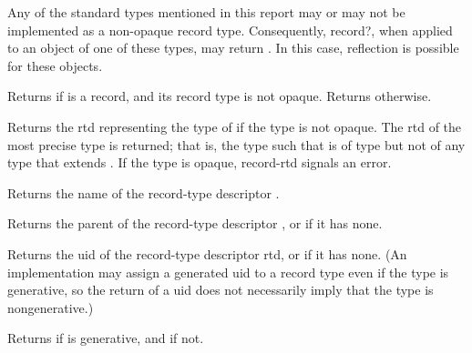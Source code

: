 Any of the standard types mentioned in this report may or may not be
implemented as a non-opaque record type.  Consequently, {\cf record?},
when applied to an object of one of these types, may return
\schtrue{}.  In this case, reflection is possible for these objects.

\begin{entry}{%
}
   
Returns \schtrue{} if  is a record, and its record type is
not opaque. Returns \schfalse{} otherwise.  
\end{entry}

\begin{entry}{%
}
   
Returns the rtd representing the type of  if the type is not
opaque. The rtd of the most precise type is returned; that is, the
type  such that  is of type  but not of any
type that extends .  If the type is opaque, {\cf record-rtd} signals
an error.
\end{entry}

\begin{entry}{%
}
   
Returns the name of the record-type descriptor .
\end{entry}   

\begin{entry}{%
}
   
Returns the parent of the record-type descriptor , or
\schfalse{} if it has none.
\end{entry}

\begin{entry}{%
}
   
Returns the uid of the record-type descriptor rtd, or \schfalse{} if it has none.
(An implementation may assign a generated uid to a record type even if the
type is generative, so the return of a uid does not necessarily imply that
the type is nongenerative.)
\end{entry}

\begin{entry}{%
}
   
Returns \schtrue{} if  is generative, and \schfalse{} if not.
\end{entry}

